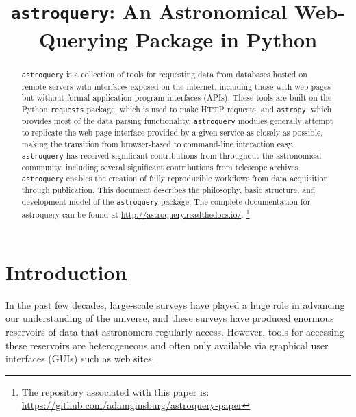 \documentclass[twocolumn]{aastex62}
\newcommand{\package}[1]{\texttt{#1}\xspace}
\newcommand{\astroquery}{\package{astroquery}}
\newcommand{\astropypkg}{\package{astropy}}
\begin{document}


\title{\astroquery: An Astronomical Web-Querying Package in Python}

\begin{abstract}
\astroquery is a collection of tools for requesting data from databases hosted
on remote servers with interfaces exposed on the internet, including those with
web pages but without formal application program interfaces (APIs).  These
tools are built on the Python
\package{requests} package, which is used to make HTTP requests, and
\astropypkg, which provides most of the data parsing functionality.
\astroquery modules generally attempt to replicate the web page interface
provided by a given service as closely as possible, making the transition
from browser-based to command-line interaction easy.
\astroquery
has received significant contributions from throughout the astronomical community,
including several significant contributions from telescope archives.
\astroquery enables the creation of fully reproducible workflows from data
acquisition through publication.  This document describes the philosophy, basic
structure, and development model of the \astroquery package.
The complete documentation for astroquery can be found at
\url{http://astroquery.readthedocs.io/}.
\footnote{%
The repository associated with this paper is:\\
\url{https://github.com/adamginsburg/astroquery-paper}
}
\end{abstract}


\section{Introduction}
In the past few decades, large-scale surveys have played a huge role in
advancing our understanding of the universe, and these surveys have produced
enormous reservoirs of data that astronomers regularly access.  However, tools
for accessing these reservoirs are heterogeneous and often only available via
graphical user interfaces (GUIs) such as web sites.
\end{document}
